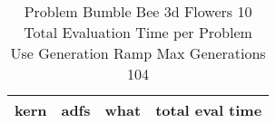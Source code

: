 \begin{table}[H]
\caption{Problem  Bumble Bee 3d  Flowers 10\\Total Evaluation Time per Problem \\ Use Generation Ramp  Max Generations 104\\}
\begin{center}
\scalebox{1.0} %
{
\begin{tabular}{lllr}
\hline
kern & adfs & what & total eval time \\
\hline


\end{tabular}
}
\end{center}
\end{table}


